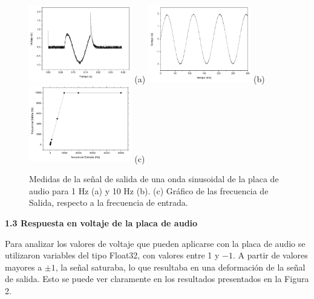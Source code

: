 \documentclass[a4paper,10pt]{article}
\begin{document}
\begin{figure}[h!]
 \centering
 \includegraphics[width=0.40\textwidth]{V2-f1Hz.jpg} (a)
 \hspace{0.1cm}
 \includegraphics[width=0.40\textwidth]{V2-f10Hz.jpg} (b)  \\
 \includegraphics[width=0.40\textwidth]{FrecuenciaEntradaSalida.jpg} (c)
 \label{fig:frecuencia}
 \caption{Medidas de la señal de salida de una onda sinusoidal de la placa de audio para 1 Hz (a) y 10 Hz (b). (c) Gráfico de las frecuencia de Salida, respecto a la frecuencia de entrada.}
\end{figure}

\vspace{0.5cm} \noindent
\textbf{\large 1.3 Respuesta en voltaje de la placa de audio} \vspace{0.25cm}

Para analizar los valores de voltaje que pueden aplicarse con la placa de audio se utilizaron variables del tipo Float32, con valores entre 1 y $-1$. A partir de valores mayores a $\pm1$, la señal saturaba, lo que resultaba en una deformación de la señal de salida. Esto se puede ver claramente en los resultados presentados en la Figura 2.
\end{document}
